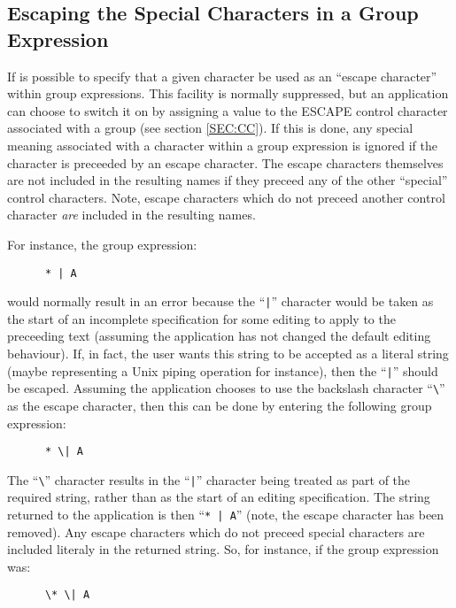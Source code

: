 \subsection{Escaping the Special Characters in a Group Expression}
If is possible to specify that a given character be used as an ``escape
character'' within group expressions. This facility is normally
suppressed, but an application can choose to switch it on by assigning a
value to the ESCAPE control character associated with a group (see
section \ref{SEC:CC}). If this is done, any special meaning associated
with a character within a group expression is ignored if the character is
preceeded by an escape character. The escape characters themselves are
not included in the resulting names if they preceed any of the other
``special'' control characters. Note, escape characters which do not
preceed another control character {\em are} included in the resulting
names.

For instance, the group expression:

\small
\begin{verbatim}
      * | A
\end{verbatim}
\normalsize

would normally result in an error because the ``\verb+|+'' character
would be taken as the start of an incomplete specification for some
editing to apply to the preceeding text (assuming the application has not
changed the default editing behaviour). If, in fact, the user wants this
string to be accepted as a literal string (maybe representing a Unix
piping operation for instance), then the ``\verb+|+'' should be escaped.
Assuming the application chooses to use the backslash character
``\verb+\+'' as the escape character, then this can be done by entering
the following group expression:

\small
\begin{verbatim}
      * \| A
\end{verbatim}
\normalsize

The ``\verb+\+'' character results in the ``\verb+|+'' character being
treated as part of the required string, rather than as the start of an
editing specification. The string returned to the application is then
``\verb+* | A+'' (note, the escape character has been removed). Any
escape characters which do not preceed special characters are included
literaly in the returned string. So, for instance, if the group
expression was:

\small
\begin{verbatim}
      \* \| A
\end{verbatim}
\normalsize

